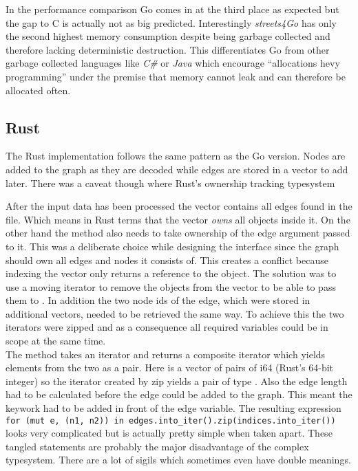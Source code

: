 In the performance comparison Go comes in at the third place as expected but the gap to C is actually not as big predicted. Interestingly \textit{streets4Go} has only the second highest memory consumption despite being garbage collected and therefore lacking deterministic destruction. This differentiates Go from other garbage collected languages like \textit{C\#} or \textit{Java} which encourage ``allocations hevy programming'' under the premise that memory cannot leak and can therefore be allocated often.

\subsection{Rust}
\label{subsec:Implementation::SequentialBenchmark::Rust}

The Rust implementation follows the same pattern as the Go version. Nodes are added to the graph as they are decoded while edges are stored in a vector to add later. There was a caveat though where Rust's ownership tracking typesystem

After the input data has been processed the  vector contains all edges found in the file. Which means in Rust terms that the vector \textit{owns} all objects inside it. On the other hand the  method also needs to take ownership of the edge argument passed to it. This was a deliberate choice while designing the interface since the graph should own all edges and nodes it consists of. This creates a conflict because indexing the vector only returns a reference to the object. The solution was to use a moving iterator to remove the objects from the vector to be able to pass them to . In addition the two node ids of the edge, which were stored in additional vectors, needed to be retrieved the same way. To achieve this the two iterators were zipped and as a consequence all required variables could be in scope at the same time.
\\


The  method takes an iterator and returns a composite iterator which yields elements from the two as a pair. Here  is a vector of pairs of i64 (Rust's 64-bit integer) so the iterator created by zip yields a pair of type . Also the edge length had to be calculated before the edge could be added to the graph. This meant the  keywork had to be added in front of the edge variable. The resulting expression \lstinline|for (mut e, (n1, n2)) in edges.into_iter().zip(indices.into_iter())| looks very complicated but is actually pretty simple when taken apart. These tangled statements are probably the major disadvantage of the complex typesystem. There are a lot of sigils which sometimes even have double meanings.

